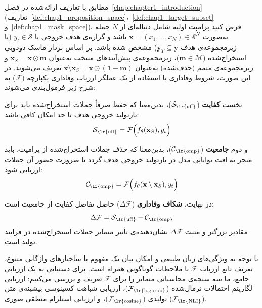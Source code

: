 مطابق با تعاریف ارائه‌شده در فصل~\ref{chap:chapter1_introduction} (تعاریف~\ref{def:chap1_proposition_space}،\;~\ref{def:chap1_target_subset} و~\ref{def:chap1_mask_space})، فرض کنید پرامپت اولیه شامل دنباله‌ای از $N$ جمله به‌صورت $\mathbf{x} = (x_1, \dots, x_N) \in \mathcal{S}^N$ باشد و گزاره‌ی هدف خروجی با $y_t \in \mathcal{S}$ (یا زیرمجموعه‌ی هدف $\mathbf{y}_T \subseteq \mathbf{y}$) مشخص شده باشد. بر اساس بردار ماسک دودویی استخراج‌شده ($\mathbf{m} \in \mathcal{M}$)، زیرمجموعه‌ی پیش‌آیندهای منتخب به‌عنوان $\mathbf{x}_S = \mathbf{x} \odot \mathbf{m}$ و زیرمجموعه‌ی متمم (حذف‌شده) به‌عنوان $\mathbf{x} \setminus \mathbf{x}_S = \mathbf{x} \odot (\mathbf{1} - \mathbf{m})$ تعریف می‌شوند. در این صورت، شروط وفاداری با استفاده از یک عملگر ارزیاب وفاداری یکپارچه ($\mathcal{F}$) به شرح زیر فرمول‌بندی می‌شوند:

نخست \textbf{کفایت} ($\mathcal{S}_{\text{\lr{uff}}}$)، بدین‌معنا که حفظ صرفاً جملات استخراج‌شده باید برای بازتولید خروجی هدف تا حد امکان کافی باشد:
\begin{equation}\label{eq:chap5_sufficiency_base}
    \mathcal{S}_{\text{\lr{uff}}} = \mathcal{F}\Big(f_\theta(\mathbf{x}_S), y_t\Big)
\end{equation}

و دوم \textbf{جامعیت} ($\mathcal{C}_{\text{\lr{omp}}}$)، بدین‌معنا که حذف جملات استخراج‌شده از پرامپت، باید منجر به افت توانایی مدل در بازتولید خروجی هدف گردد تا ضرورت حضور آن جملات ارزیابی شود:
\begin{equation}\label{eq:chap5_comprehensiveness_base}
    \mathcal{C}_{\text{\lr{omp}}} = \mathcal{F}\Big(f_\theta(\mathbf{x} \setminus \mathbf{x}_S), y_t\Big)
\end{equation}

در نهایت، \textbf{شکاف وفاداری} ($\Delta\mathcal{F}$) حاصل تفاضل کفایت از جامعیت است:
\begin{equation}\label{eq:chap5_gap_base}
    \Delta\mathcal{F} = \mathcal{S}_{\text{\lr{uff}}} - \mathcal{C}_{\text{\lr{omp}}}
\end{equation}
مقادیر بزرگتر و مثبت $\Delta\mathcal{F}$ نشان‌دهنده‌ی تأثیر متمایز جملات استخراج‌شده در فرایند تولید است.

با توجه به ویژگی‌های زبان طبیعی و امکان بیان یک مفهوم با ساختارهای واژگانی متنوع، تعریف تابع ارزیاب $\mathcal{F}$ با ملاحظات گوناگونی همراه است. برای دستیابی به یک ارزیابی جامع، ما سه سنجه‌ی محاسباتی متمایز را برای $\mathcal{F}$ تعریف و بررسی می‌کنیم: ارزیابی لگاریتم احتمالات نرمال‌شده ($\mathcal{F}_{\text{\lr{logprob}}}$)، ارزیابی شباهت کسینوسی بیشینه‌ی متن تولیدی ($\mathcal{F}_{\text{\lr{cosine}}}$)، و ارزیابی استلزام منطقی صوری ($\mathcal{F}_{\text{\lr{NLI}}}$).


